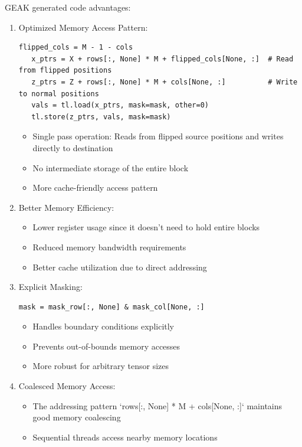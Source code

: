 \documentclass{article}
\begin{document}
GEAK generated code advantages:
\begin{enumerate}

\item Optimized Memory Access Pattern:
   \begin{lstlisting}[style=pythonstyle]
   flipped_cols = M - 1 - cols
   x_ptrs = X + rows[:, None] * M + flipped_cols[None, :]  # Read from flipped positions
   z_ptrs = Z + rows[:, None] * M + cols[None, :]          # Write to normal positions
   vals = tl.load(x_ptrs, mask=mask, other=0)
   tl.store(z_ptrs, vals, mask=mask)
   \end{lstlisting}
   \begin{itemize}
       \item  Single pass operation: Reads from flipped source positions and writes directly to destination
   \item No intermediate storage of the entire block
   \item  More cache-friendly access pattern
   \end{itemize}


\item Better Memory Efficiency:
    \begin{itemize}
        \item Lower register usage since it doesn't need to hold entire blocks
   \item Reduced memory bandwidth requirements
   \item Better cache utilization due to direct addressing
    \end{itemize}


\item Explicit Masking:
   \begin{lstlisting}[style=pythonstyle]
   mask = mask_row[:, None] & mask_col[None, :]
   \end{lstlisting}
   \begin{itemize}
       \item Handles boundary conditions explicitly
       \item Prevents out-of-bounds memory accesses
       \item More robust for arbitrary tensor sizes
   \end{itemize}


\item Coalesced Memory Access:
    \begin{itemize}
        \item The addressing pattern `rows[:, None] * M + cols[None, :]` maintains good memory coalescing
        \item Sequential threads access nearby memory locations 
    \end{itemize}
\end{enumerate}
\end{document}
